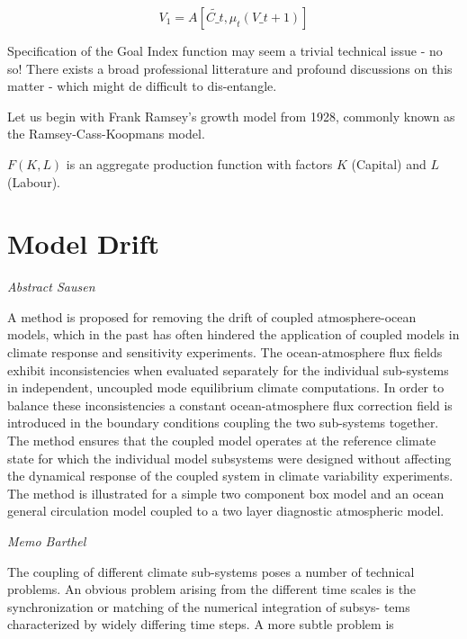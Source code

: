 \documentclass[
]{book}
\begin{document}
\[V_1 = A [\tilde{C\_t}, \mu_t(V\_{t+1})]\]

Specification of the Goal Index function may seem a trivial technical issue -
no so!
There exists a broad professional litterature and profound discussions on
this matter -
which might de difficult to dis-entangle.

Let us begin with Frank Ramsey's growth model from 1928, commonly known
as the Ramsey-Cass-Koopmans model.

\(F(K,L)\) is an aggregate production function with factors \(K\) (Capital) and
\(L\) (Labour).

\hypertarget{model-drift}{%
\section{Model Drift}\label{model-drift}}

\emph{Abstract Sausen}

A method is proposed for removing the
drift of coupled atmosphere-ocean models, which
in the past has often hindered the application of
coupled models in climate response and sensitivity experiments.
The ocean-atmosphere flux fields
exhibit inconsistencies when evaluated separately
for the individual sub-systems in independent,
uncoupled mode equilibrium climate computations.
In order to balance these inconsistencies a
constant ocean-atmosphere flux correction field is
introduced in the boundary conditions coupling
the two sub-systems together. The method ensures
that the coupled model operates at the reference
climate state for which the individual model subsystems
were designed without affecting the dynamical response of the coupled system in climate
variability experiments. The method is illustrated
for a simple two component box model and an
ocean general circulation model coupled to a two
layer diagnostic atmospheric model.

\emph{Memo Barthel}

The coupling of different climate sub-systems poses a number of technical
problems. An obvious problem arising from the
different time scales is the synchronization or
matching of the numerical integration of subsys-
tems characterized by widely differing time steps.
A more subtle problem is
\end{document}
